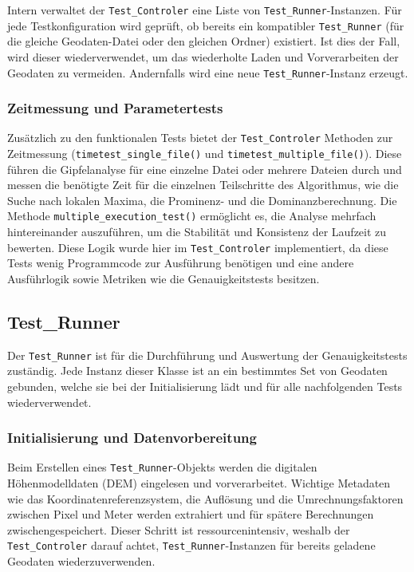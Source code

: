 Intern verwaltet der \verb|Test_Controler| eine Liste von \verb|Test_Runner|-Instanzen. Für jede Testkonfiguration wird geprüft, ob bereits ein kompatibler \verb|Test_Runner| (für die gleiche Geodaten-Datei oder den gleichen Ordner) existiert. Ist dies der Fall, wird dieser wiederverwendet, um das wiederholte Laden und Vorverarbeiten der Geodaten zu vermeiden. Andernfalls wird eine neue \verb|Test_Runner|-Instanz erzeugt. 

\subsubsection{Zeitmessung und Parametertests}
Zusätzlich zu den funktionalen Tests bietet der \verb|Test_Controler| Methoden zur Zeitmessung (\verb|timetest_single_file()| und \verb|timetest_multiple_file()|). Diese führen die Gipfelanalyse für eine einzelne Datei oder mehrere Dateien durch und messen die benötigte Zeit für die einzelnen Teilschritte des Algorithmus, wie die Suche nach lokalen Maxima, die Prominenz- und die Dominanzberechnung. Die Methode \verb|multiple_execution_test()| ermöglicht es, die Analyse mehrfach hintereinander auszuführen, um die Stabilität und Konsistenz der Laufzeit zu bewerten. Diese Logik wurde hier im \verb|Test_Controler| implementiert, da diese Tests wenig Programmcode zur Ausführung benötigen und eine andere Ausführlogik sowie Metriken wie die Genauigkeitstests besitzen.

\subsection{Test\_Runner}


Der \verb|Test_Runner| ist für die Durchführung und Auswertung der Genauigkeitstests zuständig. Jede Instanz dieser Klasse ist an ein bestimmtes Set von Geodaten gebunden, welche sie bei der Initialisierung lädt und für alle nachfolgenden Tests wiederverwendet.

\subsubsection{Initialisierung und Datenvorbereitung}
Beim Erstellen eines \verb|Test_Runner|-Objekts werden die digitalen Höhenmodelldaten (DEM) eingelesen und vorverarbeitet. Wichtige Metadaten wie das Koordinatenreferenzsystem, die Auflösung und die Umrechnungsfaktoren zwischen Pixel und Meter werden extrahiert und für spätere Berechnungen zwischengespeichert. Dieser Schritt ist ressourcenintensiv, weshalb der \verb|Test_Controler| darauf achtet, \verb|Test_Runner|-Instanzen für bereits geladene Geodaten wiederzuverwenden. 

